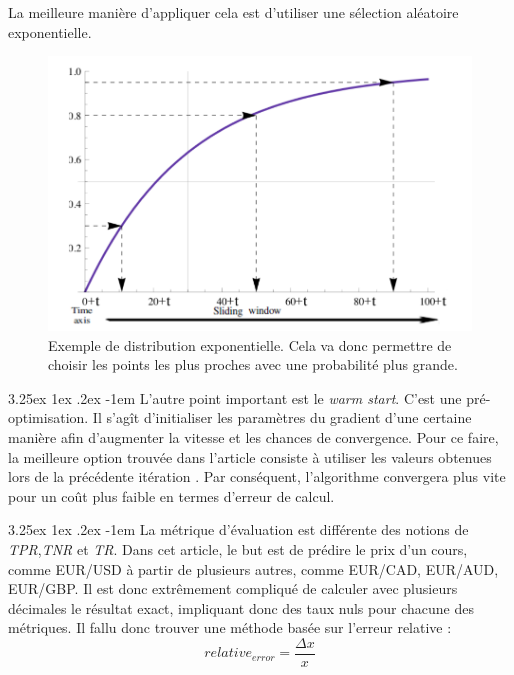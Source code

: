 \documentclass[a4paper, 11pt]{article}
\makeatletter
\renewcommand\paragraph{\@startsection{paragraph}{5}{\z@}%
  {3.25ex \@plus1ex \@minus.2ex}%
  {-1em}%
  {\normalfont\normalsize\bfseries}}
\makeatother
\begin{document}
La meilleure manière d'appliquer cela est d'utiliser une sélection aléatoire exponentielle.

\begin{figure}[H]
\centering
\includegraphics[scale=0.40]{images/choix_exp}
\caption[]{Exemple de distribution exponentielle\footnotemark.
Cela va donc permettre de choisir les points les plus proches avec une probabilité plus grande.}
\end{figure}


\paragraph{}
L'autre point important est le \textit{warm start}. C'est une pré-optimisation.
Il s'agît d'initialiser les paramètres du gradient d'une certaine manière afin d'augmenter la vitesse et les chances
de convergence. Pour ce faire, la meilleure option trouvée dans l'article consiste à utiliser les valeurs obtenues lors de la précédente itération
\cite{descente_du_gradient_stochastique}.
Par conséquent, l'algorithme convergera plus vite pour un coût plus faible en termes d'erreur de calcul.

\paragraph{}
La métrique d'évaluation est différente des notions de \textit{TPR},\textit{TNR} et \textit{TR}.
Dans cet article, le but est de prédire le prix d'un cours, comme EUR/USD à partir de plusieurs autres,
comme EUR/CAD, EUR/AUD, EUR/GBP. Il est donc extrêmement compliqué de calculer avec plusieurs décimales
le résultat exact, impliquant donc des taux nuls pour chacune des métriques.
Il fallu donc trouver une méthode basée sur l'erreur relative :
$$relative_{error} = \frac{\Delta x}{x}$$
\end{document}
